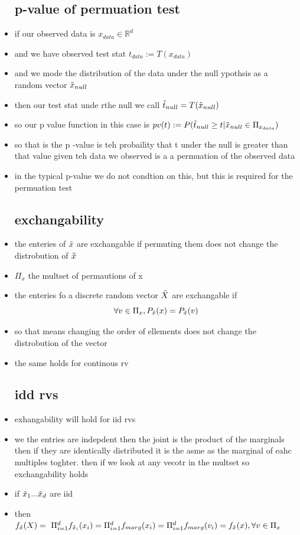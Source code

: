 \documentclass{article}
\begin{document}
\begin{itemize}
\subsection{p-value of permuation test}
\item if our observed data is $x_{data}\in \mathbb{R}^{d}$
\item and we have observed test stat $t_{data}:=T(x_{data})$
\item and we mode the distribution of the data under the null ypothsis as a random vector $\Tilde{x}_{null}$
\item then our test stat unde rthe null we call $\Tilde{t}_{null}=T(\Tilde{x}_{null})$
\item so our p value function in this case is $pv(t):=P(\Tilde{t}_{null}\geq t |\Tilde{x}_{null}\in \Pi_{x_{data}})$
\item so that is the p -value is teh probaility that t under the null is greater than that value given teh data we observed is a a permuation of the observed data
\item in the typical p-value we do not condtion on this, but this is required for the permuation test 
\subsection{exchangability}
\item the enteries of $\Tilde{x}$ are exchangable if permuting them does not change the distrobution of $\Tilde{x}$
\item $\Pi_{x}$ the multset of permautions of x 
\item the enteries fo a discrete random vector $\Tilde{X}$ are exchangable if $$\forall v\in \Pi_{x}, P_{\Tilde{x}}(x)=P_{\Tilde{x}}(v)$$
\item so that means changing the order  of ellements does not change the distrobution of the vector
\item the same holds for continous rv
\subsection{idd rvs}
\item exhangability will hold for iid rvs 
\item we the entries are indepdent then the joint is the product of the marginals then if they are identically distributed it is the asme as the marginal of eahc multiples toghter. then if we look at any vecotr in the multset so exchangability holds
\item if $\Tilde{x}_1...\Tilde{x}_{d}$ are iid 
\item then $f_{\tilde{x}}(X)=\ \Pi_{i=1}^{d}f_{\Tilde{x}_i}(x_i)=\Pi_{i=1}^{d}f_{marg}(x_i)=\Pi_{i=1}^{d}f_{marg}(v_i)=f_{\Tilde{x}}(x), \forall v \in \Pi_{x}$

\end{itemize}
\end{document}
